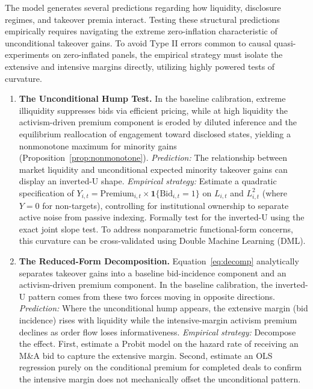 \documentclass[11pt]{article}
\newcommand{\1}{\mathbf{1}}
\begin{document}
The model generates several predictions regarding how liquidity, disclosure regimes, and takeover premia interact. Testing these structural predictions empirically requires navigating the extreme zero-inflation characteristic of unconditional takeover gains. To avoid Type II errors common to causal quasi-experiments on zero-inflated panels, the empirical strategy must isolate the extensive and intensive margins directly, utilizing highly powered tests of curvature.

\begin{enumerate}[label=\textbf{\arabic*.}]
    \item \textbf{The Unconditional Hump Test.} In the baseline calibration, extreme illiquidity suppresses bids via efficient pricing, while at high liquidity the activism-driven premium component is eroded by diluted inference and the equilibrium reallocation of engagement toward disclosed states, yielding a nonmonotone maximum for minority gains (Proposition~\ref{prop:nonmonotone}).
    \emph{Prediction:} The relationship between market liquidity and unconditional expected minority takeover gains can display an inverted-U shape.
    \emph{Empirical strategy:} Estimate a quadratic specification of $Y_{i,t} = \text{Premium}_{i,t} \times \1\{\text{Bid}_{i,t}=1\}$ on $L_{i,t}$ and $L_{i,t}^2$ (where $Y=0$ for non-targets), controlling for institutional ownership to separate active noise from passive indexing. Formally test for the inverted-U using the exact \citet{LindMehlum2010} joint slope test. To address nonparametric functional-form concerns, this curvature can be cross-validated using Double Machine Learning (DML).

    \item \textbf{The Reduced-Form Decomposition.} Equation~\eqref{eq:decomp} analytically separates takeover gains into a baseline bid-incidence component and an activism-driven premium component. In the baseline calibration, the inverted-U pattern comes from these two forces moving in opposite directions.
    \emph{Prediction:} Where the unconditional hump appears, the extensive margin (bid incidence) rises with liquidity while the intensive-margin activism premium declines as order flow loses informativeness.
    \emph{Empirical strategy:} Decompose the effect. First, estimate a Probit model on the hazard rate of receiving an M\&A bid to capture the extensive margin. Second, estimate an OLS regression purely on the conditional premium for completed deals to confirm the intensive margin does not mechanically offset the unconditional pattern.


\end{enumerate}
\end{document}
